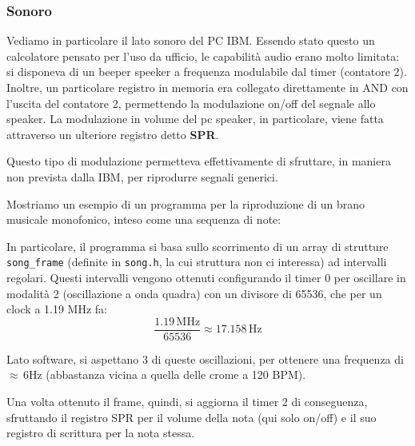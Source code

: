 \documentclass[a4paper,11pt]{article}
\begin{document}
\subsubsection{Sonoro}
Vediamo in particolare il lato sonoro del PC IBM.
Essendo stato questo un calcolatore pensato per l'uso da ufficio, le capabilità audio erano molto limitata: si disponeva di un beeper speeker a frequenza modulabile dal timer (contatore 2).
Inoltre, un particolare registro in memoria era collegato direttamente in AND con l'uscita del contatore 2, permettendo la modulazione on/off del segnale allo speaker.
La modulazione in volume del pc speaker, in particolare, viene fatta attraverso un ulteriore registro detto \textbf{SPR}.

Questo tipo di modulazione permetteva effettivamente di sfruttare, in maniera non prevista dalla IBM, per riprodurre segnali generici.

Mostriamo un esempio di un programma per la riproduzione di un brano musicale monofonico, inteso come una sequenza di note:



In particolare, il programma si basa sullo scorrimento di un array di strutture \lstinline|song_frame| (definite in \lstinline|song.h|, la cui struttura non ci interessa) ad intervalli regolari.
Questi intervalli vengono ottenuti configurando il timer 0 per oscillare in modalità 2 (oscillazione a onda quadra) con un divisore di 65536, che per un clock a 1.19 MHz fa:
$$
\frac{1.19 \, \mathrm{MHz}}{65536} \approx 17.158 \, \mathrm{Hz}
$$

Lato software, si aspettano 3 di queste oscillazioni, per ottenere una frequenza di $\approx \, 6 \mathrm{Hz}$ (abbastanza vicina a quella delle crome a 120 BPM).

Una volta ottenuto il frame, quindi, si aggiorna il timer 2 di conseguenza, sfruttando il registro SPR per il volume della nota (qui solo on/off) e il suo registro di scrittura per la nota stessa.
\end{document}
